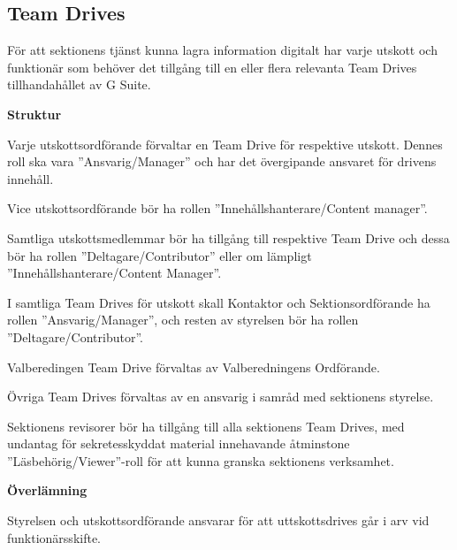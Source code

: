 \documentclass[../_main/handlingar.tex]{subfiles}
\begin{document}
    \vspace{3px}
    \subsection{Team Drives}
    \vspace{3px}

    För att sektionens tjänst kunna lagra information digitalt har varje utskott och funktionär som behöver det tillgång till en eller flera relevanta Team Drives tillhandahållet av G Suite. 

    \textbf{Struktur}
    \begin{dashlist}

    \item Varje utskottsordförande förvaltar en Team Drive för respektive utskott. Dennes roll ska vara ''Ansvarig/Manager'' och har det övergipande ansvaret för drivens innehåll. 
    
    \item Vice utskottsordförande bör ha rollen ''Innehållshanterare/Content manager''. 

    \item Samtliga utskottsmedlemmar bör ha tillgång till respektive Team Drive och dessa bör ha rollen ''Deltagare/Contributor'' eller om lämpligt ''Innehållshanterare/Content Manager''. 
    
    \item I samtliga Team Drives för utskott skall Kontaktor och Sektionsordförande ha rollen ''Ansvarig/Manager'', och resten av styrelsen bör ha rollen ''Deltagare/Contributor''.
    
    \item Valberedingen Team Drive förvaltas av Valberedningens Ordförande.
    
    \item Övriga Team Drives förvaltas av en ansvarig i samråd med sektionens styrelse. 

    \item Sektionens revisorer bör ha tillgång till alla sektionens Team Drives, med undantag för sekretesskyddat material innehavande åtminstone ''Läsbehörig/Viewer''-roll för att kunna granska sektionens verksamhet. 
     
    \end{dashlist}
    
    \vspace{3px}
    \textbf{Överlämning}

    Styrelsen och utskottsordförande ansvarar för att uttskottsdrives går i arv vid funktionärsskifte.
\end{document}
